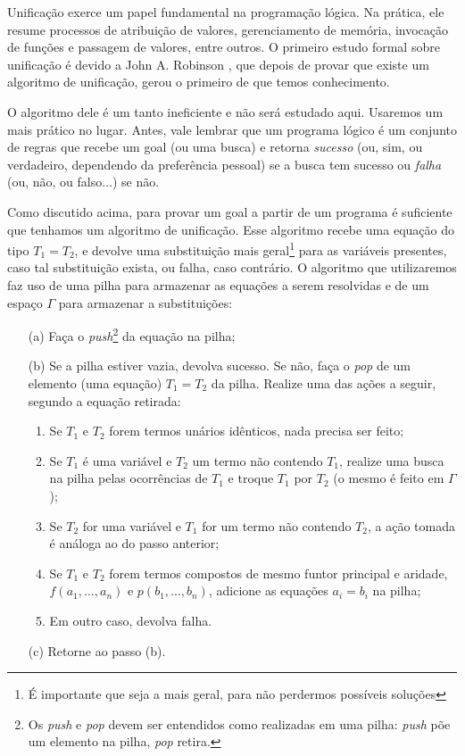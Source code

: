\documentclass{article}
\theoremstyle{remark}
\theoremstyle{theorem}
\begin{document}
Unificação exerce um papel fundamental na programação lógica. Na prática, ele resume processos de atribuição de valores, gerenciamento de memória, invocação de funções e passagem de valores, entre outros. O primeiro estudo formal sobre unificação é devido a John A. Robinson \cite{robinson}, que depois de provar que existe um algoritmo de unificação, gerou o primeiro de que temos conhecimento.

O algoritmo dele é um tanto ineficiente e não será estudado aqui. Usaremos um mais prático no lugar. Antes, vale lembrar que um programa lógico é um conjunto de regras que recebe um goal (ou uma busca) e retorna {\it sucesso} (ou, sim, ou verdadeiro, dependendo da preferência pessoal) se a busca tem sucesso ou {\it falha} (ou, não, ou falso...) se não.

Como discutido acima, para provar um goal a partir de um programa é suficiente que tenhamos um algoritmo de unificação. Esse algoritmo recebe uma equação do tipo $T_1 = T_2$, e devolve uma substituição mais geral\footnote{É importante que seja a mais geral, para não perdermos possíveis soluções}
para as variáveis presentes, caso tal substituição exista, ou falha, caso contrário. O algoritmo que utilizaremos faz uso de uma pilha para armazenar as equações a serem resolvidas e de um espaço
$\Gamma$ para armazenar a substituições:

\begin{itemize}
    \item[(a)] Faça o \textit{push}\footnote{Os \textit{push} e \textit{pop} devem ser entendidos como realizadas em uma pilha: \textit{push} põe um elemento na pilha, \textit{pop} retira.} da equação na pilha;
    \item[(b)] Se a pilha estiver vazia, devolva sucesso. Se não, faça o \textit{pop} de um elemento (uma equação) $T_1 = T_2$ da pilha. Realize uma das ações a seguir, segundo a equação retirada:
      \begin{enumerate}
        \item Se $T_1$ e $T_2$ forem termos unários idênticos, nada precisa ser feito;
        \item Se $T_1$ é uma variável e $T_2$ um termo não contendo $T_1$, realize uma busca na pilha pelas ocorrências de $T_1$ e troque $T_1$ por $T_2$ (o mesmo é feito em $\Gamma$);
        \item Se $T_2$ for uma variável e $T_1$ for um termo não contendo $T_2$, a ação tomada é análoga ao do passo anterior;
        \item Se $T_1$ e $T_2$ forem termos compostos de mesmo funtor principal e aridade, $f(a_1, ..., a_n)$ e $p(b_1, ..., b_n)$, adicione as equações $a_i = b_i$ na pilha;
        \item Em outro caso, devolva falha.
      \end{enumerate}
    \item[(c)] Retorne ao passo (b).
\end{itemize}
\end{document}
